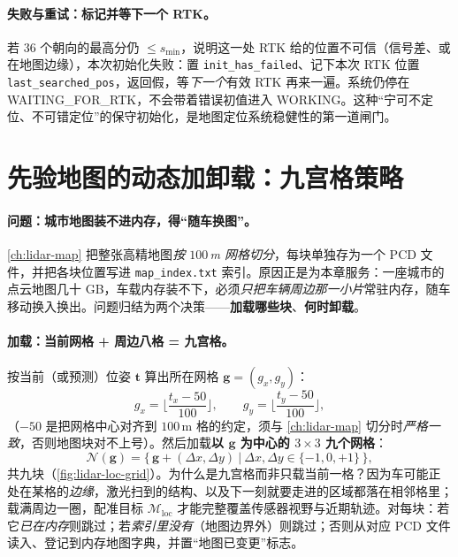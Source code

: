 \paragraph{失败与重试：标记并等下一个 RTK。}
若 $36$ 个朝向的最高分仍 $\le s_{\min}$，说明这一处 RTK 给的位置不可信（信号差、或在地图边缘），本次初始化失败：置 \texttt{init\_has\_failed}、记下本次 RTK 位置 \texttt{last\_searched\_pos}，返回假，等\emph{下一个}有效 RTK 再来一遍。系统仍停在 \textsf{WAITING\_FOR\_RTK}，不会带着错误初值进入 \textsf{WORKING}。这种“宁可不定位、不可错定位”的保守初始化，是地图定位系统稳健性的第一道闸门。

\section{先验地图的动态加卸载：九宫格策略}
\label{sec:lidar-loc-mapload}

\paragraph{问题：城市地图装不进内存，得“随车换图”。}
\cref{ch:lidar-map} 把整张高精地图\emph{按 $100$\,m 网格切分}，每块单独存为一个 PCD 文件，并把各块位置写进 \texttt{map\_index.\allowbreak txt} 索引。原因正是为本章服务：一座城市的点云地图几十 GB，车载内存装不下，必须\emph{只把车辆周边那一小片}常驻内存，随车移动换入换出。问题归结为两个决策——\textbf{加载哪些块}、\textbf{何时卸载}。

\paragraph{加载：当前网格 + 周边八格 = 九宫格。}
按当前（或预测）位姿 $\mathbf t$ 算出所在网格 $\mathbf g=(g_x,g_y)$：
\begin{equation}
  g_x=\Big\lfloor\frac{t_x-50}{100}\Big\rfloor,\qquad
  g_y=\Big\lfloor\frac{t_y-50}{100}\Big\rfloor,
  \label{eq:lidar-loc-grid}
\end{equation}
（$-50$ 是把网格中心对齐到 $100$\,m 格的约定，须与 \cref{ch:lidar-map} 切分时\emph{严格一致}，否则地图块对不上号）。然后加载\textbf{以 $\mathbf g$ 为中心的 $3\times3$ 九个网格}：
\begin{equation}
  \mathcal N(\mathbf g)=\big\{\,\mathbf g+(\Delta x,\Delta y)\ \big|\ \Delta x,\Delta y\in\{-1,0,+1\}\,\big\},
  \label{eq:lidar-loc-nine}
\end{equation}
共九块（\cref{fig:lidar-loc-grid}）。为什么是九宫格而非只载当前一格？因为车可能正处在某格的\emph{边缘}，激光扫到的结构、以及下一刻就要走进的区域都落在相邻格里；载满周边一圈，配准目标 $\mathcal M_{\mathrm{loc}}$ 才能完整覆盖传感器视野与近期轨迹。对每块：若它\emph{已在内存}则跳过；若\emph{索引里没有}（地图边界外）则跳过；否则从对应 PCD 文件读入、登记到内存地图字典，并置“地图已变更”标志。

